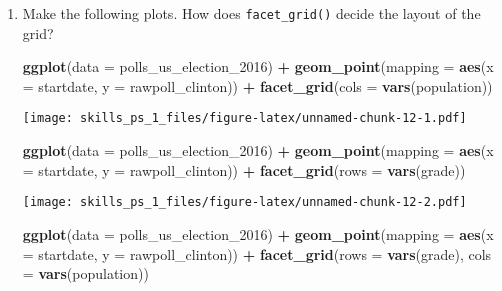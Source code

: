 \documentclass[
]{article}
\newenvironment{Shaded}{\begin{snugshade}}{\end{snugshade}}
\newcommand{\DataTypeTok}[1]{\textcolor[rgb]{0.13,0.29,0.53}{#1}}
\newcommand{\DecValTok}[1]{\textcolor[rgb]{0.00,0.00,0.81}{#1}}
\newcommand{\KeywordTok}[1]{\textcolor[rgb]{0.13,0.29,0.53}{\textbf{#1}}}
\newcommand{\NormalTok}[1]{#1}
\newcommand{\OperatorTok}[1]{\textcolor[rgb]{0.81,0.36,0.00}{\textbf{#1}}}
\newcommand{\StringTok}[1]{\textcolor[rgb]{0.31,0.60,0.02}{#1}}
\begin{document}
\begin{enumerate}
\def\labelenumi{\arabic{enumi}.}
\item
  Make the following plots. How does \texttt{facet\_grid()} decide the
  layout of the grid?

\begin{Shaded}
\begin{Highlighting}[]
\KeywordTok{ggplot}\NormalTok{(}\DataTypeTok{data =}\NormalTok{ polls_us_election_}\DecValTok{2016}\NormalTok{) }\OperatorTok{+}\StringTok{ }
\StringTok{  }\KeywordTok{geom_point}\NormalTok{(}\DataTypeTok{mapping =} \KeywordTok{aes}\NormalTok{(}\DataTypeTok{x =}\NormalTok{ startdate, }
                           \DataTypeTok{y =}\NormalTok{ rawpoll_clinton)) }\OperatorTok{+}
\StringTok{  }\KeywordTok{facet_grid}\NormalTok{(}\DataTypeTok{cols =} \KeywordTok{vars}\NormalTok{(population))}
\end{Highlighting}
\end{Shaded}

  \texttt{[image: skills\_ps\_1\_files/figure-latex/unnamed-chunk-12-1.pdf]}

\begin{Shaded}
\begin{Highlighting}[]
\KeywordTok{ggplot}\NormalTok{(}\DataTypeTok{data =}\NormalTok{ polls_us_election_}\DecValTok{2016}\NormalTok{) }\OperatorTok{+}\StringTok{ }
\StringTok{  }\KeywordTok{geom_point}\NormalTok{(}\DataTypeTok{mapping =} \KeywordTok{aes}\NormalTok{(}\DataTypeTok{x =}\NormalTok{ startdate, }
                           \DataTypeTok{y =}\NormalTok{ rawpoll_clinton)) }\OperatorTok{+}
\StringTok{  }\KeywordTok{facet_grid}\NormalTok{(}\DataTypeTok{rows =} \KeywordTok{vars}\NormalTok{(grade))}
\end{Highlighting}
\end{Shaded}

  \texttt{[image: skills\_ps\_1\_files/figure-latex/unnamed-chunk-12-2.pdf]}

\begin{Shaded}
\begin{Highlighting}[]
\KeywordTok{ggplot}\NormalTok{(}\DataTypeTok{data =}\NormalTok{ polls_us_election_}\DecValTok{2016}\NormalTok{) }\OperatorTok{+}\StringTok{ }
\StringTok{  }\KeywordTok{geom_point}\NormalTok{(}\DataTypeTok{mapping =} \KeywordTok{aes}\NormalTok{(}\DataTypeTok{x =}\NormalTok{ startdate, }
                           \DataTypeTok{y =}\NormalTok{ rawpoll_clinton)) }\OperatorTok{+}
\StringTok{  }\KeywordTok{facet_grid}\NormalTok{(}\DataTypeTok{rows =} \KeywordTok{vars}\NormalTok{(grade), }\DataTypeTok{cols =} \KeywordTok{vars}\NormalTok{(population))}
\end{Highlighting}
\end{Shaded}


\end{enumerate}
\end{document}
